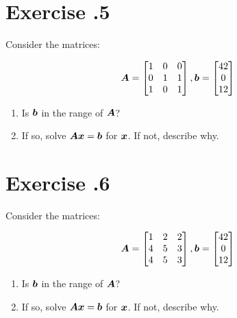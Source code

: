 \documentclass{article}
\begin{document}
\section*{Exercise \chapnumber.5}
Consider the matrices:

\begin{equation}
{\bm{A}}
=
\begin{bmatrix}
    1 & 0 & 0 \\
    0 & 1 & 1 \\
    1 & 0 & 1 
\end{bmatrix}
,
{\bm{b}}
=
\begin{bmatrix}
    42 \\
    0 \\
    12 
\end{bmatrix}
\end{equation} 

\begin{enumerate}[label=(\alph*)]

\item Is ${\bm{b}}$ in the range of ${\bm{A}}$?

\item If so, solve ${\bm{A}} {\bm{x}} = {\bm{b}}$ for ${\bm{x}}$.  If not, describe why.
\end{enumerate}

\section*{Exercise \chapnumber.6}
Consider the matrices:

\begin{equation}
{\bm{A}}
=
\begin{bmatrix}
    1 & 2 & 2 \\
    4 & 5 & 3 \\
    4 & 5 & 3
\end{bmatrix}
,
{\bm{b}}
=
\begin{bmatrix}
    42 \\
    0 \\
    12
\end{bmatrix}
\end{equation} 

\begin{enumerate}[label=(\alph*)]

\item Is ${\bm{b}}$ in the range of ${\bm{A}}$?

\item If so, solve ${\bm{A}} {\bm{x}} = {\bm{b}}$ for ${\bm{x}}$.  If not, describe why.
\end{enumerate}
\end{document}
